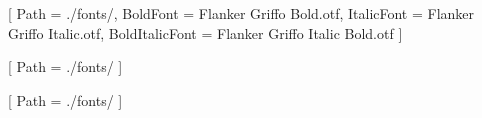 \usepackage{fontspec}
\usepackage{titlesec}
\usepackage{geometry}
\usepackage{longtable, booktabs}
\usepackage{fancyhdr}
\usepackage[hidelinks]{hyperref}
\usepackage{makeidx}

\makeindex

\makeatletter
\def\cleardoublepage{\clearpage\if@twoside \ifodd\c@page\else
  \hbox{}
  \thispagestyle{empty}
  \newpage
  \if@twocolumn\hbox{}\newpage\fi\fi\fi}
\makeatother

\setmainfont{Flanker Griffo.otf}[
    Path = ./fonts/,
    BoldFont = Flanker Griffo Bold.otf,
    ItalicFont = Flanker Griffo Italic.otf,
    BoldItalicFont = Flanker Griffo Italic Bold.otf
]

\newfontfamily{}[
    Path = ./fonts/
]

\newfontfamily{}[
    Path = ./fonts/
]

\geometry{
  a4paper,
  twoside,
  inner=0.75in, 
  outer=3in, 
  marginparwidth=2.5in, 
  marginparsep=0.25in,
  footskip=0.5in
}

\setlength{\columnsep}{0.25in}
\newenvironment{twocol}{\begin{multicols}{2}}{\end{multicols}}

\pagestyle{fancy}
\fancyhf{} %

\fancyhfoffset[LE,RO]{0.5\dimexpr\marginparwidth+\marginparsep\relax}

\fancyhead[RE,LO]{\headerfont\footnotesize\leftmark}
\fancyhead[LE,RO]{\headerfont\footnotesize\thepage}

\fancyfoot[C]{}

\renewcommand{\headrulewidth}{0pt}

\renewcommand{\footnote}[1]{%
  \marginpar{%
    \raggedright
    \sidebarfont
    \footnotesize
    \ignorespaces #1
  }%
}

